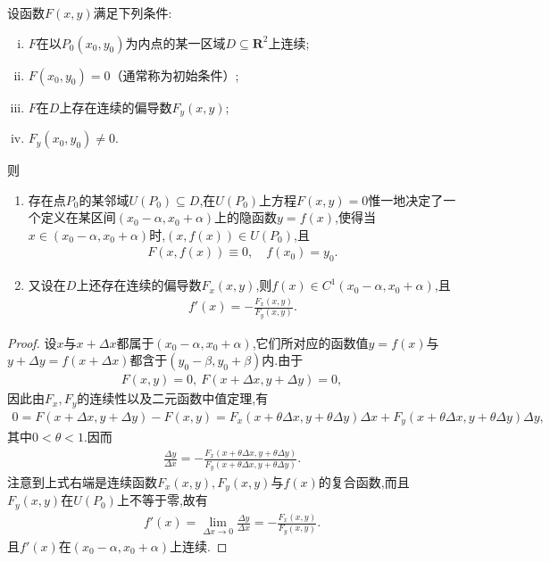 \documentclass[../../main.tex]{subfiles}%
\begin{document}
\begin{theorem}[隐函数可微性定理]\label{theorem:隐函数可微性定理}
设函数$F(x,y)$满足下列条件:
\begin{enumerate}[(i)]
\item $F$在以$P_0(x_0,y_0)$为内点的某一区域$D \subseteq \mathbf{R}^2$上连续;
\item $F(x_0,y_0) = 0$（通常称为初始条件）;
\item $F$在$D$上存在连续的偏导数$F_y(x,y)$;
\item $F_y(x_0,y_0) \neq 0$.
\end{enumerate}
则
\begin{enumerate}[(1)]
\item 存在点$P_0$的某邻域$U(P_0) \subseteq D$,在$U(P_0)$上方程$F(x,y) = 0$惟一地决定了一个定义在某区间$(x_0-\alpha,x_0+\alpha)$上的隐函数$y = f(x)$,使得当$x \in (x_0-\alpha,x_0+\alpha)$时,$(x,f(x)) \in U(P_0)$,且
\begin{align*}
F(x,f(x)) \equiv 0,\quad f(x_0) = y_0.
\end{align*}

\item 又设在$D$上还存在连续的偏导数$F_x(x,y)$,则$f(x)\in C^1(x_0-\alpha,x_0+\alpha)$,且
\begin{align*}
f'(x) = -\frac{F_x(x,y)}{F_y(x,y)}. 
\end{align*}
\end{enumerate}
\end{theorem}
\begin{proof}
设$x$与$x+\Delta x$都属于$(x_0-\alpha,x_0+\alpha)$,它们所对应的函数值$y=f(x)$与$y+\Delta y=f(x+\Delta x)$都含于$(y_0-\beta,y_0+\beta)$内.由于
\begin{align*}
F(x,y) = 0,\ F(x+\Delta x,y+\Delta y) = 0,
\end{align*}
因此由$F_x,F_y$的连续性以及二元函数中值定理,有
\begin{align*}
0 = F(x+\Delta x,y+\Delta y) - F(x,y) = F_x(x+\theta\Delta x,y+\theta\Delta y)\Delta x + F_y(x+\theta\Delta x,y+\theta\Delta y)\Delta y,
\end{align*}
其中$0 < \theta < 1$.因而
\begin{align*}
\frac{\Delta y}{\Delta x} = -\frac{F_x(x+\theta\Delta x,y+\theta\Delta y)}{F_y(x+\theta\Delta x,y+\theta\Delta y)}.
\end{align*}
注意到上式右端是连续函数$F_x(x,y),F_y(x,y)$与$f(x)$的复合函数,而且$F_y(x,y)$在$U(P_0)$上不等于零,故有
\begin{align*}
f'(x) = \lim_{\Delta x \to 0} \frac{\Delta y}{\Delta x} = -\frac{F_x(x,y)}{F_y(x,y)}.
\end{align*}
且$f'(x)$在$(x_0-\alpha,x_0+\alpha)$上连续.

\end{proof}
\end{document}
